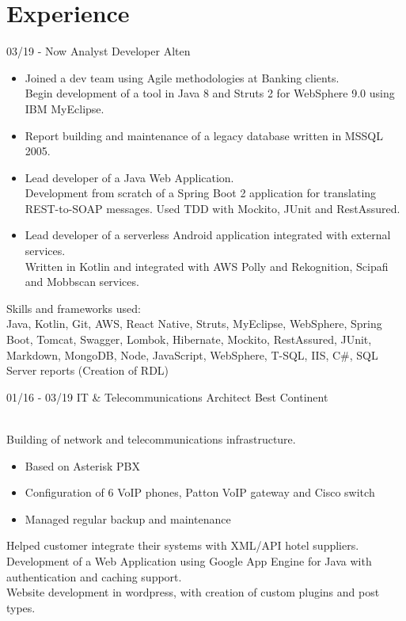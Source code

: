 \documentclass[]{friggeri-cv}
\begin{document}
\section{Experience}
\begin{entrylist}
  \entry
    {03/19 - Now}
    {Analyst Developer}
    {Alten}
    {{\begin{itemize}
        \item {Joined a dev team using Agile methodologies at Banking clients.\\Begin development of a tool in Java 8 and Struts 2 for WebSphere 9.0 using IBM MyEclipse.}
        \item {Report building and maintenance of a legacy database written in MSSQL 2005.}
        \item {Lead developer of a Java Web Application.\\Development from scratch of a Spring Boot 2 application for translating REST-to-SOAP messages. Used TDD with Mockito, JUnit and RestAssured.}
        \item {Lead developer of a serverless Android application integrated with external services.\\ Written in Kotlin and integrated with AWS Polly and Rekognition, Scipafi and Mobbscan services.}
    \end{itemize}}
      {Skills and frameworks used:\\Java, Kotlin, Git, AWS, React Native, Struts, MyEclipse, WebSphere, Spring Boot, Tomcat, Swagger, Lombok, Hibernate, Mockito, RestAssured, JUnit, Markdown, MongoDB, Node, JavaScript, WebSphere, T-SQL, IIS, C\#, SQL Server reports (Creation of RDL)}}
  \entry
    {01/16 - 03/19}
    {IT \& Telecommunications Architect}
    {Best Continent}
    {{\\Building of network and telecommunications infrastructure.}
            {\begin{itemize}
                \item{Based on Asterisk PBX}
                \item{Configuration of 6 VoIP phones, Patton VoIP gateway and Cisco switch}
                \item{Managed regular backup and maintenance}
            \end{itemize}}
    {Helped customer integrate their systems with XML/API hotel suppliers.}
    {\\Development of a Web Application using Google App Engine for Java with authentication and caching support.}
    {\\Website development in wordpress, with creation of custom plugins and post types.}
}
\end{entrylist}
\end{document}
